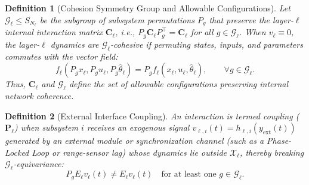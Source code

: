 \documentclass[journal]{IEEEtran}
\newtheorem{definition}{Definition}
\begin{document}
\begin{definition}[Cohesion Symmetry Group and Allowable Configurations]
Let $\mathcal{G}_\ell \le S_{N_\ell}$ be the subgroup of subsystem permutations $P_g$ that preserve the layer-$\ell$ internal interaction matrix $\mathbf{C}_\ell$, i.e., $P_g \mathbf{C}_\ell P_g^\top = \mathbf{C}_\ell$ for all $g \in \mathcal{G}_\ell$. When $v_\ell \equiv 0$, the layer-$\ell$ dynamics are $\mathcal{G}_\ell$-cohesive if permuting states, inputs, and parameters commutes with the vector field:
\begin{equation}
f_\ell(P_g x_\ell, P_g u_\ell, P_g \hat{\theta}_\ell) = P_g f_\ell(x_\ell, u_\ell, \hat{\theta}_\ell), \qquad \forall g \in \mathcal{G}_\ell.
\end{equation}
Thus, $\mathbf{C}_\ell$ and $\mathcal{G}_\ell$ define the set of \emph{allowable configurations} preserving internal network coherence.
\end{definition}

\begin{definition}[External Interface Coupling]
An interaction is termed \emph{coupling} ($\mathbf{P}_\ell$) when subsystem $i$ receives an exogenous signal $v_{\ell,i}(t) = h_{\ell,i}(y_{\text{ext}}(t))$ generated by an external module or synchronization channel (such as a Phase-Locked Loop or range-sensor lag) whose dynamics lie outside $\mathcal{X}_\ell$, thereby breaking $\mathcal{G}_\ell$-equivariance:
\begin{equation}
P_g E_\ell v_\ell(t) \neq E_\ell v_\ell(t) \quad \text{for at least one } g \in \mathcal{G}_\ell.
\end{equation}
\end{definition}
\end{document}
